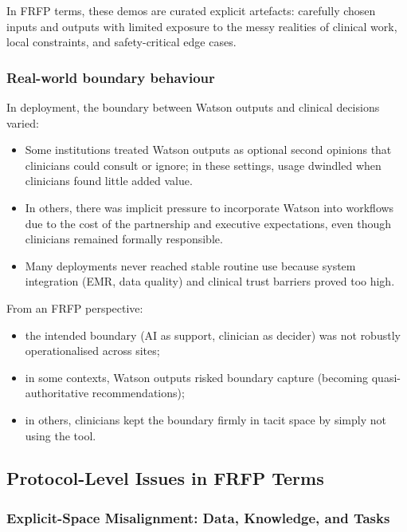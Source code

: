 In FRFP terms, these demos are curated explicit artefacts: carefully chosen
inputs and outputs with limited exposure to the messy realities of clinical
work, local constraints, and safety-critical edge cases.


\subsubsection*{Real-world boundary behaviour}

In deployment, the boundary between Watson outputs and clinical decisions
varied:

\begin{itemize}
  \item Some institutions treated Watson outputs as optional second opinions
        that clinicians could consult or ignore; in these settings, usage
        dwindled when clinicians found little added value.
  \item In others, there was implicit pressure to incorporate Watson into
        workflows due to the cost of the partnership and executive
        expectations, even though clinicians remained formally responsible.
  \item Many deployments never reached stable routine use because system
        integration (EMR, data quality) and clinical trust barriers proved
        too high.
\end{itemize}

From an FRFP perspective:

\begin{itemize}
  \item the intended boundary (AI as support, clinician as decider) was
        not robustly operationalised across sites;
  \item in some contexts, Watson outputs risked boundary capture
        (becoming quasi-authoritative recommendations);
  \item in others, clinicians kept the boundary firmly in tacit space
        by simply not using the tool.
\end{itemize}

\subsection{Protocol-Level Issues in FRFP Terms}

\subsubsection*{Explicit-Space Misalignment: Data, Knowledge, and Tasks}

